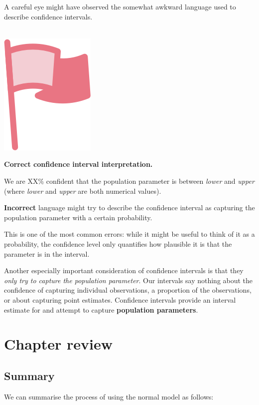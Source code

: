\documentclass[
  10pt,
  openany]{book}
\newenvironment{mdframedwithfootImportant}
{   
    \savenotes
    \begin{mdframed}[%
    topline=true, bottomline=true, linecolor=oiR, linewidth=0.5pt,
    rightline=false, leftline=false,
    backgroundcolor=oiLGray]
    \renewcommand{\thempfootnote}{\arabic{footnote}}
    }
{
    \end{mdframed}
    \spewnotes
}
\newenvironment{important}{
    \let\oldtextbf\textbf
    \renewcommand{\textbf}[1]{{\textcolor{oiR}{\oldtextbf{##1}}}}
\vspace{4mm}
\begin{mdframedwithfootImportant}
\begin{minipage}[t]{0.10\textwidth}
{$\:$ \\ \setkeys{Gin}{width=2.5em,keepaspectratio}\includegraphics{images/_icons/important.png}}
\end{minipage}
\hfill
\begin{minipage}[t]{0.90\textwidth}
\vspace{-2mm}
\setlength{\parskip}{1em}
}{\end{minipage}
\end{mdframedwithfootImportant}
\vspace{4mm}
}
\begin{document}
A careful eye might have observed the somewhat awkward language used to describe confidence intervals.

\begin{important}
\textbf{Correct confidence interval interpretation.}

We are XX\% confident that the population parameter is between \emph{lower} and \emph{upper} (where \emph{lower} and \emph{upper} are both numerical values).

\textbf{Incorrect} language might try to describe the confidence interval as capturing the population parameter with a certain probability.

This is one of the most common errors: while it might be useful to think of it as a probability, the confidence level only quantifies how plausible it is that the parameter is in the interval.

\end{important}

Another especially important consideration of confidence intervals is that they \emph{only try to capture the population parameter}.
Our intervals say nothing about the confidence of capturing individual observations, a proportion of the observations, or about capturing point estimates.
Confidence intervals provide an interval estimate for and attempt to capture \textbf{population parameters}.


\clearpage

\hypertarget{chp13-review}{%
\section{Chapter review}\label{chp13-review}}

\hypertarget{summary-7}{%
\subsection{Summary}\label{summary-7}}

We can summarise the process of using the normal model as follows:
\end{document}
